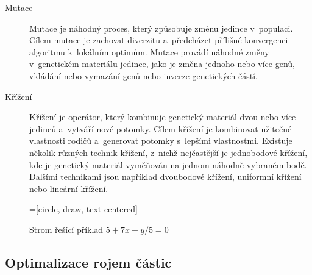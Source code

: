 \begin{description}
    \item[Mutace] Mutace je náhodný proces, který způsobuje změnu jedince v~populaci. Cílem mutace je zachovat diverzitu a~předcházet přílišné konvergenci algoritmu k~lokálním optimům. Mutace provádí náhodné změny v~genetickém materiálu jedince, jako je změna jednoho nebo více genů, vkládání nebo vymazání genů nebo inverze genetických částí.
    \item[Křížení] Křížení je operátor, který kombinuje genetický materiál dvou nebo více jedinců a~vytváří nové potomky. Cílem křížení je kombinovat užitečné vlastnosti rodičů a~generovat potomky s~lepšími vlastnostmi. Existuje několik různých technik křížení, z~nichž nejčastější je jednobodové křížení, kde je genetický materiál vyměňován na jednom náhodně vybraném bodě. Dalšími technikami jsou například dvoubodové křížení, uniformní křížení nebo lineární křížení.
\end{description}

\begin{figure}[ht]
    \centering
    =[circle, draw, text centered]
    \caption{Strom řešící příklad $5 + 7x + y/5 = 0$}
\end{figure}
\FloatBarrier

\subsection{Optimalizace rojem částic}

